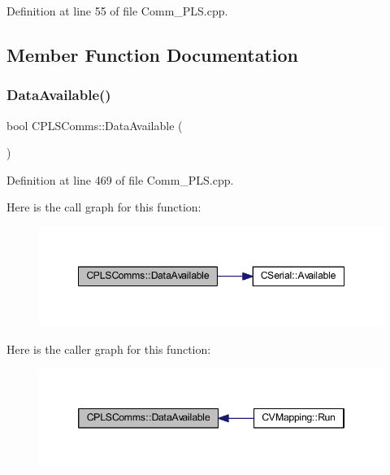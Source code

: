Definition at line 55 of file Comm\+\_\+\+P\+L\+S.\+cpp.



\subsection{Member Function Documentation}
\mbox{\label{class_c_p_l_s_comms_ae9d000eff184034954829d76162654a5}} 
\subsubsection{\texorpdfstring{Data\+Available()}{DataAvailable()}}
{\footnotesize\ttfamily bool C\+P\+L\+S\+Comms\+::\+Data\+Available (\begin{DoxyParamCaption}{ }\end{DoxyParamCaption})}



Definition at line 469 of file Comm\+\_\+\+P\+L\+S.\+cpp.

Here is the call graph for this function\+:\nopagebreak
\begin{figure}[H]
\begin{center}
\leavevmode
\includegraphics[width=348pt]{class_c_p_l_s_comms_ae9d000eff184034954829d76162654a5_cgraph}
\end{center}
\end{figure}
Here is the caller graph for this function\+:\nopagebreak
\begin{figure}[H]
\begin{center}
\leavevmode
\includegraphics[width=346pt]{class_c_p_l_s_comms_ae9d000eff184034954829d76162654a5_icgraph}
\end{center}
\end{figure}
\mbox{\label{class_c_p_l_s_comms_a3124eaa4549706962c7024c7c97e82b0}} 
